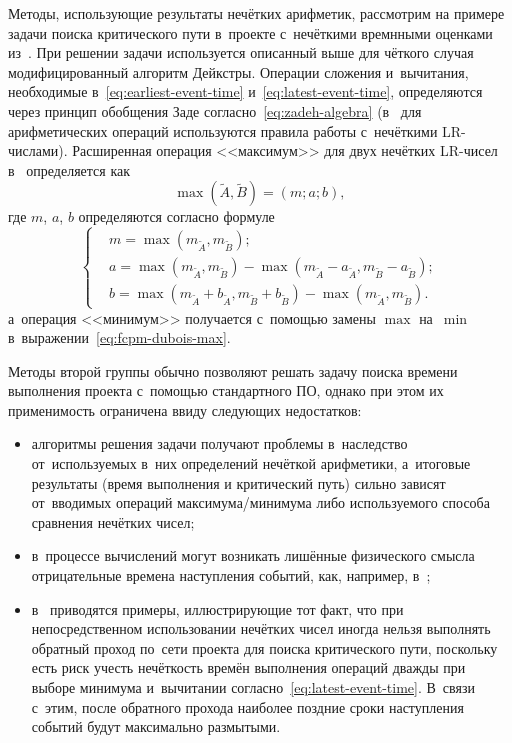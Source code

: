 Методы, использующие результаты нечётких арифметик, рассмотрим на примере задачи поиска критического пути в~проекте с~нечёткими времнными оценками из~\cite{Dubois_Prade}. При решении задачи используется описанный выше для чёткого случая модифицированный алгоритм Дейкстры. Операции сложения и~вычитания, необходимые в~\eqref{eq:earliest-event-time} и~\eqref{eq:latest-event-time}, определяются через принцип обобщения Заде согласно~\eqref{eq:zadeh-algebra} (в~\cite{Iran_Railways, Uskov_FCPM, Leondes} для арифметических операций используются правила работы с~нечёткими LR-числами). Расширенная операция <<максимум>> для двух нечётких LR-чисел в~\cite{Dubois_Prade, Uskov_FCPM} определяется как
\begin{equation*}
  \max \left(\tilde A, \tilde B \right) = \left(m; a; b \right),
\end{equation*}
где $m$, $a$, $b$ определяются согласно формуле
\begin{equation}
  \label{eq:fcpm-dubois-max}
  \left \{ \begin{aligned}
    & m = \max \left( m_{\tilde A}, m_{\tilde B} \right); \\
    & a = \max \left( m_{\tilde A}, m_{\tilde B} \right) - \max \left( m_{\tilde A} - a_{\tilde A}, m_{\tilde B} - a_{\tilde B} \right); \\
    & b = \max \left( m_{\tilde A} + b_{\tilde A}, m_{\tilde B} + b_{\tilde B} \right) - \max \left( m_{\tilde A}, m_{\tilde B} \right).
  \end{aligned} \right.
\end{equation}
а~операция <<минимум>> получается с~помощью замены $\max$ на~$\min$ в~выражении~\eqref{eq:fcpm-dubois-max}.

Методы второй группы обычно позволяют решать задачу поиска времени выполнения проекта с~помощью стандартного ПО, однако при этом их применимость ограничена ввиду следующих недостатков:
\begin{itemize}
  \item алгоритмы решения задачи получают проблемы в~наследство от~используемых в~них определений нечёткой арифметики, а~итоговые результаты (время выполнения и критический путь) сильно зависят от~вводимых операций максимума/минимума либо используемого способа сравнения нечётких чисел;
  \item в~процессе вычислений могут возникать лишённые физического смысла отрицательные времена наступления событий, как, например, в~\cite{Liang_Han_FCPM};
  \item в~\cite{Leondes, Zielinski_Preprint} приводятся примеры, иллюстрирующие тот факт, что при непосредственном использовании нечётких чисел иногда нельзя выполнять обратный проход по~сети проекта для поиска критического пути, поскольку есть риск учесть нечёткость времён выполнения операций дважды при выборе минимума и~вычитании согласно~\eqref{eq:latest-event-time}. В~связи с~этим, после обратного прохода наиболее поздние сроки наступления событий будут максимально размытыми.
\end{itemize}

